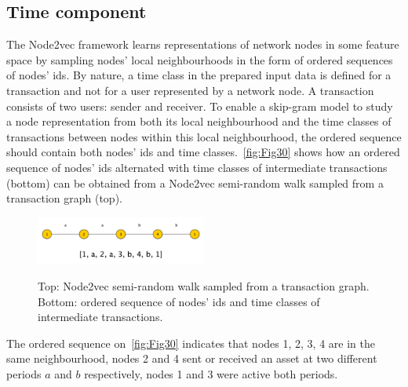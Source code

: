 \subsection{Time component}
\label{Time component}
The Node2vec framework learns representations of network nodes in some feature space by sampling nodes' local neighbourhoods in the form of ordered sequences of nodes' ids. By nature, a time class in the prepared input data is defined for a transaction and not for a user represented by a network node. A transaction consists of two users: sender and receiver. To enable a skip-gram model to study a node representation from both its local neighbourhood and the time classes of transactions between nodes within this local neighbourhood, the ordered sequence should contain both nodes' ids and time classes.~\autoref{fig:Fig30} shows how an ordered sequence of nodes' ids alternated with time classes of intermediate transactions (bottom) can be obtained from a Node2vec semi-random walk sampled from a transaction graph (top).
\begin{figure}[!ht]
	\centering
	\includegraphics[width=0.5\textwidth]{images/Fig30.pdf}\\
	\caption{Top: Node2vec semi-random walk sampled from a transaction graph. Bottom: ordered sequence of nodes' ids and time classes of intermediate transactions.}
	\label{fig:Fig30}
\end{figure}

The ordered sequence on~\autoref{fig:Fig30} indicates that nodes 1, 2, 3, 4 are in the same neighbourhood, nodes 2 and 4 sent or received an asset at two different periods $a$ and $b$ respectively, nodes 1 and 3 were active both periods. 

